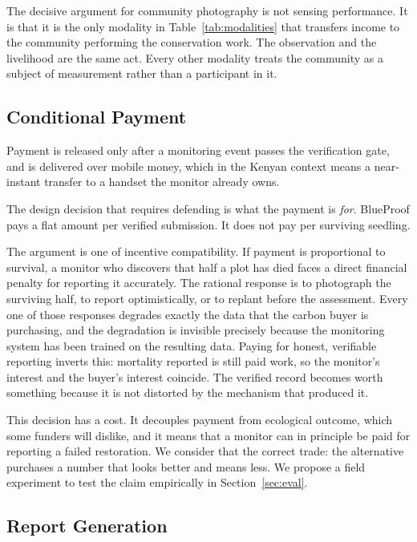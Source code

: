 \documentclass[10pt,twocolumn,a4paper]{article}
\begin{document}
The decisive argument for community photography is not sensing performance. It
is that it is the only modality in Table~\ref{tab:modalities} that transfers
income to the community performing the conservation work. The observation and
the livelihood are the same act. Every other modality treats the community as a
subject of measurement rather than a participant in it.

\subsection{Conditional Payment}
\label{sec:incentive}

Payment is released only after a monitoring event passes the verification gate,
and is delivered over mobile money, which in the Kenyan context means a
near-instant transfer to a handset the monitor already owns.

The design decision that requires defending is what the payment is \emph{for}.
BlueProof pays a flat amount per verified submission. It does not pay per
surviving seedling.

The argument is one of incentive compatibility. If payment is proportional to
survival, a monitor who discovers that half a plot has died faces a direct
financial penalty for reporting it accurately. The rational response is to
photograph the surviving half, to report optimistically, or to replant before
the assessment. Every one of those responses degrades exactly the data that the
carbon buyer is purchasing, and the degradation is invisible precisely because
the monitoring system has been trained on the resulting data. Paying for honest,
verifiable reporting inverts this: mortality reported is still paid work, so the
monitor's interest and the buyer's interest coincide. The verified record
becomes worth something because it is not distorted by the mechanism that
produced it.

This decision has a cost. It decouples payment from ecological outcome, which
some funders will dislike, and it means that a monitor can in principle be paid
for reporting a failed restoration. We consider that the correct trade: the
alternative purchases a number that looks better and means less. We propose a
field experiment to test the claim empirically in Section~\ref{sec:eval}.

\subsection{Report Generation}
\end{document}
